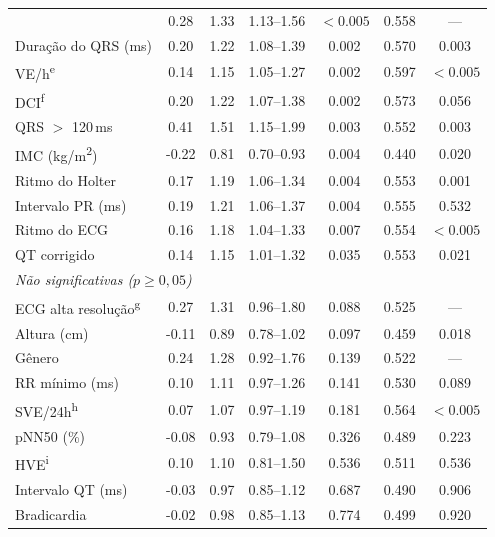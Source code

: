 \begin{table}[htbp]
{\begin{tabular}{lcccccc}
			 & 0.28  & 1.33 & 1.13--1.56 & $<0.005$  & 0.558   & ---            \\
			Duração do QRS (ms)
			 & 0.20  & 1.22 & 1.08--1.39 & 0.002     & 0.570   & 0.003          \\
			VE/h\textsuperscript{e}
			 & 0.14  & 1.15 & 1.05--1.27 & 0.002     & 0.597   & $<0.005$       \\
			DCI\textsuperscript{f}
			 & 0.20  & 1.22 & 1.07--1.38 & 0.002     & 0.573   & 0.056          \\
			QRS $>$ 120\,ms
			 & 0.41  & 1.51 & 1.15--1.99 & 0.003     & 0.552   & 0.003          \\
			IMC (kg/m\textsuperscript{2})
			 & -0.22 & 0.81 & 0.70--0.93 & 0.004     & 0.440   & 0.020          \\
			Ritmo do Holter
			 & 0.17  & 1.19 & 1.06--1.34 & 0.004     & 0.553   & 0.001          \\
			Intervalo PR (ms)
			 & 0.19  & 1.21 & 1.06--1.37 & 0.004     & 0.555   & 0.532          \\
			Ritmo do ECG
			 & 0.16  & 1.18 & 1.04--1.33 & 0.007     & 0.554   & $<0.005$       \\
			QT corrigido
			 & 0.14  & 1.15 & 1.01--1.32 & 0.035     & 0.553   & 0.021          \\
			\midrule
			\multicolumn{7}{l}{\textit{Não significativas ($p \geq 0{,}05$)}}   \\
			\addlinespace
			ECG alta resolu\c{c}\~ao\textsuperscript{g}
			 & 0.27  & 1.31 & 0.96--1.80 & 0.088     & 0.525   & ---            \\
			Altura (cm)
			 & -0.11 & 0.89 & 0.78--1.02 & 0.097     & 0.459   & 0.018          \\
			G\^enero
			 & 0.24  & 1.28 & 0.92--1.76 & 0.139     & 0.522   & ---            \\
			RR m\'inimo (ms)
			 & 0.10  & 1.11 & 0.97--1.26 & 0.141     & 0.530   & 0.089          \\
			SVE/24h\textsuperscript{h}
			 & 0.07  & 1.07 & 0.97--1.19 & 0.181     & 0.564   & $<0.005$       \\
			pNN50 (\%)
			 & -0.08 & 0.93 & 0.79--1.08 & 0.326     & 0.489   & 0.223          \\
			HVE\textsuperscript{i}
			 & 0.10  & 1.10 & 0.81--1.50 & 0.536     & 0.511   & 0.536          \\
			Intervalo QT (ms)
			 & -0.03 & 0.97 & 0.85--1.12 & 0.687     & 0.490   & 0.906          \\
			Bradicardia
			 & -0.02 & 0.98 & 0.85--1.13 & 0.774     & 0.499   & 0.920          \\

\end{tabular}}
\end{table}
